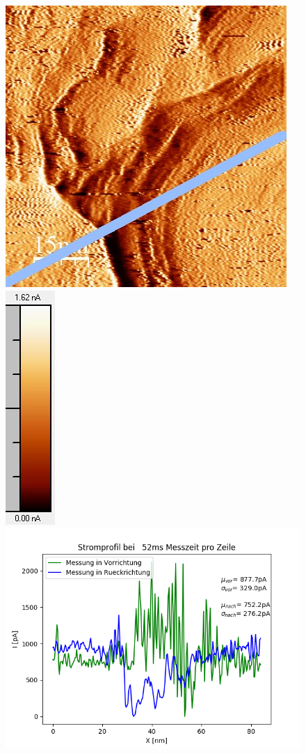 \documentclass[12pt,a4paper]{article}
\begin{document}
\begin{figure}[H]
\includegraphics[scale=0.6]{Bilder/Anhang/Zeit/Strom/0_052_Zeit_nach_Strom.jpg}
\includegraphics[scale=0.6]{Bilder/Anhang/Zeit/Strom/0_052_Zeit_nach_Strom_Skala.jpg}
\includegraphics[scale=0.5]{Bilder/Anhang/Zeit/Strom/Strom_Profil_Zeit_0052.png}

\end{figure}
\end{document}
